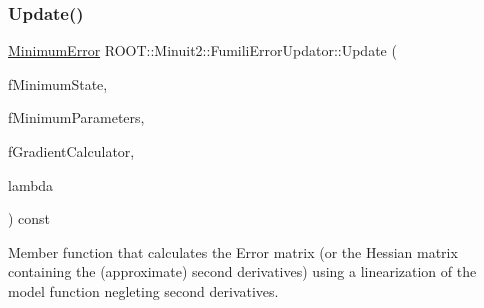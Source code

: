 \subsubsection{\texorpdfstring{Update()}{Update()}\hspace{0.1cm}{\footnotesize\ttfamily [1/6]}}
{\footnotesize\ttfamily \mbox{\hyperlink{classROOT_1_1Minuit2_1_1MinimumError}{Minimum\+Error}} R\+O\+O\+T\+::\+Minuit2\+::\+Fumili\+Error\+Updator\+::\+Update (\begin{DoxyParamCaption}\item[{const \mbox{\hyperlink{classROOT_1_1Minuit2_1_1MinimumState}{Minimum\+State}} \&}]{f\+Minimum\+State,  }\item[{const \mbox{\hyperlink{classROOT_1_1Minuit2_1_1MinimumParameters}{Minimum\+Parameters}} \&}]{f\+Minimum\+Parameters,  }\item[{const \mbox{\hyperlink{classROOT_1_1Minuit2_1_1GradientCalculator}{Gradient\+Calculator}} \&}]{f\+Gradient\+Calculator,  }\item[{double}]{lambda }\end{DoxyParamCaption}) const\hspace{0.3cm}{\ttfamily [virtual]}}

Member function that calculates the Error matrix (or the Hessian matrix containing the (approximate) second derivatives) using a linearization of the model function negleting second derivatives.


